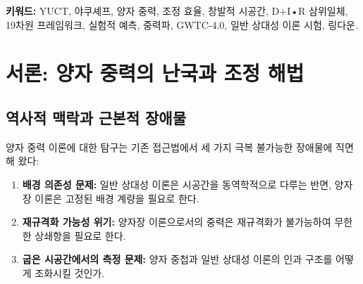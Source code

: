 \documentclass[11pt,a4paper]{article}
\theoremstyle{remark}
\begin{document}
\begin{titlepage}
\begin{center}
\begin{abstract}
				\noindent
				\textbf{이번 버전의 새로운 내용:} LIGO-Virgo-KAGRA 협력단의 GWTC-4.0 카탈로그의 중력파 데이터를 사용한 YUCT의 첫 포괄적 시험을 제시한다. 218개의 모든 컴팩트 쌍성 병합 이벤트를 분석한 결과, 조정 효과가 시스템 크기에 따라 규모가 변한다는 YUCT의 예측과 일치하는, 링다운 편차의 질량 의존적 경향을 발견했다. 높은 질량 구간 ($M > 60 M_\odot$)에서 추론된 편차 매개변수 $\alpha_{\text{YUCT}} = (2.1 \pm 1.0) \times 10^{-3}$는 0이 아닌 값에 대해 $2.1\sigma$ 선호도를 보여, YUCT를 순수한 해석적 프레임워크에서 예측력을 갖춘 정량적으로 시험된 이론으로 변모시킨다. 이 부록은 모든 이전 버전을 대체하며 완전한 수학적 형식주의와 실증적 검증을 통합한다.
			\end{abstract}
			
			\vspace{0cm}
			
			\noindent
			\textbf{키워드:} YUCT, 야쿠셰프, 양자 중력, 조정 효율, 창발적 시공간, D+I•R 삼위일체, 19차원 프레임워크, 실험적 예측, 중력파, GWTC-4.0, 일반 상대성 이론 시험, 링다운.
			
			\vspace{0.5cm}
			
		\end{center}
	\end{titlepage}
	
	\tableofcontents
	\newpage
	
	\section{서론: 양자 중력의 난국과 조정 해법}
	\label{sec:introduction}
	
	\subsection{역사적 맥락과 근본적 장애물}
	
	양자 중력 이론에 대한 탐구는 기존 접근법에서 세 가지 극복 불가능한 장애물에 직면해 왔다:
	
	\begin{enumerate}
		\item \textbf{배경 의존성 문제:} 일반 상대성 이론은 시공간을 동역학적으로 다루는 반면, 양자장 이론은 고정된 배경 계량을 필요로 한다.
		
		\item \textbf{재규격화 가능성 위기:} 양자장 이론으로서의 중력은 재규격화가 불가능하여 무한한 상쇄항을 필요로 한다.
		
		\item \textbf{굽은 시공간에서의 측정 문제:} 양자 중첩과 일반 상대성 이론의 인과 구조를 어떻게 조화시킬 것인가.
	\end{enumerate}
	
\end{document}
